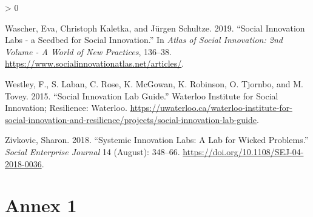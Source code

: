 \documentclass[AMA,STIX1COL,APA,STIX2COL]{WileyNJD-v2}
\newlength{\cslhangindent}
\newenvironment{CSLReferences}[2] %
 {%
  \setlength{\parindent}{0pt}
  \ifodd #1 \everypar{\setlength{\hangindent}{\cslhangindent}}\ignorespaces\fi
  \ifnum #2 > 0
  \setlength{\parskip}{#2\baselineskip}
  \fi
 }%
 {}
\begin{document}
\begin{CSLReferences}{1}{0}
\leavevmode\hypertarget{ref-Wascher2019}{}%
Wascher, Eva, Christoph Kaletka, and Jürgen Schultze. 2019. {``Social
Innovation Labs - a Seedbed for Social Innovation.''} In \emph{Atlas of
Social Innovation: 2nd Volume - A World of New Practices}, 136--38.
\url{https://www.socialinnovationatlas.net/articles/}.

\leavevmode\hypertarget{ref-Westley2015}{}%
Westley, F., S. Laban, C. Rose, K. McGowan, K. Robinson, O. Tjornbo, and
M. Tovey. 2015. {``Social Innovation Lab Guide.''} Waterloo Institute
for Social Innovation; Resilience: Waterloo.
\url{https://uwaterloo.ca/waterloo-institute-for-social-innovation-and-resilience/projects/social-innovation-lab-guide}.

\leavevmode\hypertarget{ref-Zivkovic2018}{}%
Zivkovic, Sharon. 2018. {``Systemic Innovation Labs: A Lab for Wicked
Problems.''} \emph{Social Enterprise Journal} 14 (August): 348--66.
\url{https://doi.org/10.1108/SEJ-04-2018-0036}.

\end{CSLReferences}

\appendix

\hypertarget{annex-1}{%
\section{Annex 1}\label{annex-1}}

\providecommand{\docline}[3]{\noalign{\global\setlength{\arrayrulewidth}{#1}}\arrayrulecolor[HTML]{#2}\cline{#3}}

\setlength{\tabcolsep}{2pt}

\renewcommand*{\arraystretch}{1.5}
\end{document}
